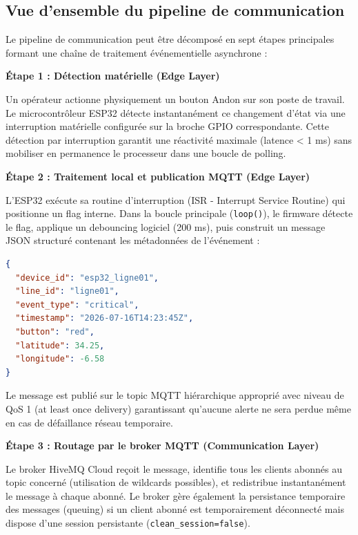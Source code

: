 \subsection{Vue d'ensemble du pipeline de communication}

Le pipeline de communication peut être décomposé en sept étapes principales formant une chaîne de traitement événementielle asynchrone :

\textbf{Étape 1 : Détection matérielle (Edge Layer)}

Un opérateur actionne physiquement un bouton Andon sur son poste de travail. Le microcontrôleur ESP32 détecte instantanément ce changement d'état via une interruption matérielle configurée sur la broche GPIO correspondante. Cette détection par interruption garantit une réactivité maximale (latence < 1 ms) sans mobiliser en permanence le processeur dans une boucle de polling.

\textbf{Étape 2 : Traitement local et publication MQTT (Edge Layer)}

L'ESP32 exécute sa routine d'interruption (ISR - Interrupt Service Routine) qui positionne un flag interne. Dans la boucle principale (\texttt{loop()}), le firmware détecte le flag, applique un debouncing logiciel (200 ms), puis construit un message JSON structuré contenant les métadonnées de l'événement :

\begin{lstlisting}[language=json,caption={Structure du message MQTT publié par ESP32}]
{
  "device_id": "esp32_ligne01",
  "line_id": "ligne01",
  "event_type": "critical",
  "timestamp": "2026-07-16T14:23:45Z",
  "button": "red",
  "latitude": 34.25,
  "longitude": -6.58
}
\end{lstlisting}

Le message est publié sur le topic MQTT hiérarchique approprié avec niveau de QoS 1 (at least once delivery) garantissant qu'aucune alerte ne sera perdue même en cas de défaillance réseau temporaire.

\textbf{Étape 3 : Routage par le broker MQTT (Communication Layer)}

Le broker HiveMQ Cloud reçoit le message, identifie tous les clients abonnés au topic concerné (utilisation de wildcards possibles), et redistribue instantanément le message à chaque abonné. Le broker gère également la persistance temporaire des messages (queuing) si un client abonné est temporairement déconnecté mais dispose d'une session persistante (\texttt{clean\_session=false}).



